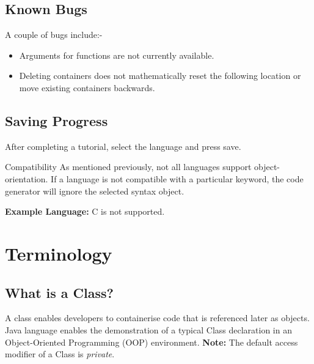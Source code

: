 \documentclass[10pt]{article}
\begin{document}
    \subsection{Known Bugs}
        A couple of bugs include:-
        \begin{itemize}
            \item Arguments for functions are not currently available.
            \item Deleting containers does not mathematically reset the following location or move existing containers backwards.
        \end{itemize}

    \subsection{Saving Progress}
        After completing a tutorial, select the language and press save.

        \begin{tip}{Compatibility}
            As mentioned previously, not all languages support object-orientation. If a language is not compatible with a particular keyword, the code generator will ignore the selected syntax object.

            \textbf{Example Language:} C is not supported.
        \end{tip}

\section{Terminology}
\label{sec:terminology}
    \subsection{What is a Class?}
        A class enables developers to containerise code that is referenced later as objects. Java language enables the demonstration of a typical Class declaration in an Object-Oriented Programming (OOP) environment. \textbf{Note:} The default access modifier of a Class is \textit{private}.
\end{document}
